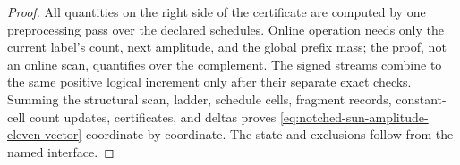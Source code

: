 \begin{proof}
All quantities on the right side of the certificate are computed by one
preprocessing pass over the declared schedules.  Online operation needs only
the current label's count, next amplitude, and the global prefix mass; the
proof, not an online scan, quantifies over the complement.  The signed
streams combine to the same positive logical increment only after their
separate exact checks.  Summing the structural scan, ladder, schedule cells,
fragment records, constant-cell count updates, certificates, and deltas
proves \cref{eq:notched-sun-amplitude-eleven-vector} coordinate by
coordinate.  The state and exclusions follow from the named interface.
\end{proof}
